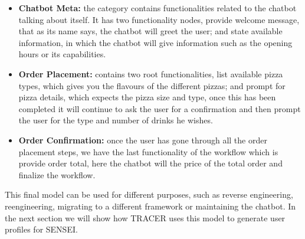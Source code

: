 \begin{itemize}
  \item \textbf{Chatbot Meta:}
    the category contains functionalities related to the chatbot talking about itself.
    It has two functionality nodes, provide welcome message, that as its name says,
    the chatbot will greet the user;
    and state available information,
    in which the chatbot will give information such as
    the opening hours or its capabilities.

  \item \textbf{Order Placement:}
    contains two root functionalities,
    list available pizza types,
    which gives you the flavours of the different pizzas;
    and prompt for pizza details,
    which expects the pizza size and type,
    once this has been completed
    it will continue to ask the user for a confirmation
    and then prompt the user for the type and number of drinks he wishes.

  \item \textbf{Order Confirmation:}
    once the user has gone through all the order placement steps,
    we have the last functionality of the workflow which is
    provide order total,
    here the chatbot will the price of the total order
    and finalize the workflow.
\end{itemize}

This final model can be used for different purposes,
such as reverse engineering, reengineering,
migrating to a different framework
or maintaining the chatbot.
In the next section we will show
how \ac{TRACER} uses this model
to generate user profiles for SENSEI.

